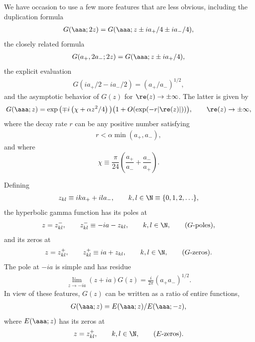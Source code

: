 \documentclass[pdftex]{sigma}
\numberwithin{equation}{section}
\begin{document}
We have occasion to use a few more features that are less obvious, including the duplication formula
\begin{gather}\label{dupl}
G(\aaa;2z)=G(\aaa;z\pm ia_{+}/4 \pm ia_{-}/4),
\end{gather}
the closely related formula
\begin{gather}\label{G2}
G(a_{+},2a_{-};2z)=G(\aaa;z\pm ia_{+}/4),
\end{gather}
the explicit evaluation
\begin{gather}\label{Geval}
G(ia_{+}/2-ia_{-}/2)=(a_{+}/a_{-})^{1/2},
\end{gather}
and the asymptotic behavior of $G(z)$ for $\re (z)\to\pm \infty$. The latter is given by
\begin{gather}\label{Gas}
	G(\aaa;z) = \exp \big({\mp} i\left(\chi+\alpha z^2/4\right)\big)\big(1 + O(\exp(-r |\re(z)|))\big),\qquad \re(z)\to\pm\infty,
\end{gather}
where the decay rate $r$ can be any positive number satisfying
\begin{gather}
r <\alpha \min(a_+,a_-),
\end{gather}
and where
\begin{equation}\label{chi}
 \chi \equiv \frac{\pi}{24}\left(\frac{a_+}{a_-} + \frac{a_-}{a_+}\right).
\end{equation}

Def\/ining
\begin{gather}\label{zkl}
z_{kl}\equiv ika_{+}+ila_{-},\qquad k,l\in\N\equiv \{ 0,1,2,\ldots\},
\end{gather}
the hyperbolic gamma function has its poles at
\begin{gather}\label{Gpo}
z=z_{kl}^-,\qquad z_{kl}^-\equiv -ia -z_{kl},\qquad k,l\in\N,\qquad (G\mbox{-poles}),
\end{gather}
and its zeros at
\begin{gather}\label{Gze}
z=z_{kl}^+,\qquad z_{kl}^+\equiv ia +z_{kl},\qquad k,l\in\N,\qquad (G\mbox{-zeros}).
\end{gather}
The pole at $-ia$ is simple and has residue
\begin{gather}\label{Gres}
\lim_{z\to -ia}(z+ia)G(z)=\frac{i}{2\pi}(a_{+}a_{-})^{1/2}.
\end{gather}
In view of these features, $G(z)$ can be written as a ratio of entire functions,
\begin{gather}\label{GE}
G(\aaa;z)=E(\aaa;z)/E(\aaa;-z),
\end{gather}
where $E(\aaa;z)$ has its zeros at
\begin{gather}\label{Eze}
z=z^{+}_{kl},\qquad k,l\in\N,\qquad (E\mbox{-zeros}).
\end{gather}
\end{document}
